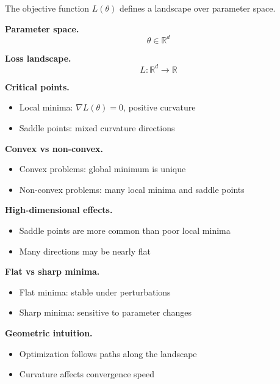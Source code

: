 The objective function $L(\theta)$ defines a landscape over parameter space.

\medskip

\noindent
\textbf{Parameter space.}
\[
\theta \in \mathbb{R}^d
\]

\medskip

\noindent
\textbf{Loss landscape.}
\[
L : \mathbb{R}^d \to \mathbb{R}
\]

\medskip

\noindent
\textbf{Critical points.}
\begin{itemize}
    \item Local minima: $\nabla L(\theta) = 0$, positive curvature
    \item Saddle points: mixed curvature directions
\end{itemize}

\medskip

\noindent
\textbf{Convex vs non-convex.}
\begin{itemize}
    \item Convex problems: global minimum is unique
    \item Non-convex problems: many local minima and saddle points
\end{itemize}

\medskip

\noindent
\textbf{High-dimensional effects.}
\begin{itemize}
    \item Saddle points are more common than poor local minima
    \item Many directions may be nearly flat
\end{itemize}

\medskip

\noindent
\textbf{Flat vs sharp minima.}
\begin{itemize}
    \item Flat minima: stable under perturbations
    \item Sharp minima: sensitive to parameter changes
\end{itemize}

\medskip

\noindent
\textbf{Geometric intuition.}
\begin{itemize}
    \item Optimization follows paths along the landscape
    \item Curvature affects convergence speed
\end{itemize}

